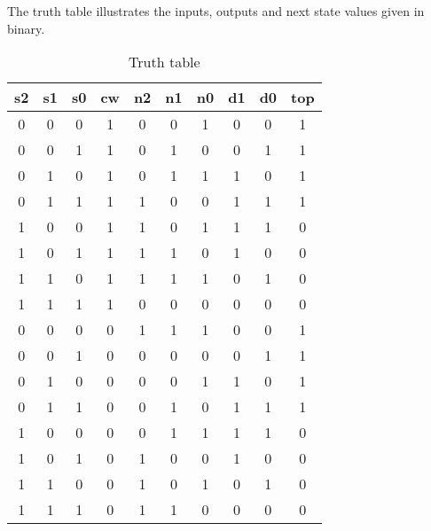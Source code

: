 The truth table illustrates the inputs, outputs and next state values given in binary.
\begin{table}
\begin{center}
\begin{tabular}{cccc|cccccc}
\centering 
s2 & s1 & s0 & cw & n2 & n1 & n0 & d1 & d0 & top\tabularnewline
\hline
\hline 
0 & 0 & 0 & 1 & 0 & 0 & 1 & 0 & 0 & 1\tabularnewline
\hline
0 & 0 & 1 & 1 & 0 & 1 & 0 & 0 & 1 & 1\tabularnewline
\hline 
0 & 1 & 0 & 1 & 0 & 1 & 1 & 1 & 0 & 1\tabularnewline
\hline 
0 & 1 & 1 & 1 & 1 & 0 & 0 & 1 & 1 & 1\tabularnewline
\hline 
1 & 0 & 0 & 1 & 1 & 0 & 1 & 1 & 1 & 0\tabularnewline
\hline 
1 & 0 & 1 & 1 & 1 & 1 & 0 & 1 & 0 & 0\tabularnewline
\hline 
1 & 1 & 0 & 1 & 1 & 1 & 1 & 0 & 1 & 0\tabularnewline
\hline 
1 & 1 & 1 & 1 & 0 & 0 & 0 & 0 & 0 & 0\tabularnewline
\hline 
0 & 0 & 0 & 0 & 1 & 1 & 1 & 0 & 0 & 1\tabularnewline
\hline 
0 & 0 & 1 & 0 & 0 & 0 & 0 & 0 & 1 & 1\tabularnewline
\hline 
0 & 1 & 0 & 0 & 0 & 0 & 1 & 1 & 0 & 1\tabularnewline
\hline 
0 & 1 & 1 & 0 & 0 & 1 & 0 & 1 & 1 & 1\tabularnewline
\hline 
1 & 0 & 0 & 0 & 0 & 1 & 1 & 1 & 1 & 0\tabularnewline
\hline 
1 & 0 & 1 & 0 & 1 & 0 & 0 & 1 & 0 & 0\tabularnewline
\hline 
1 & 1 & 0 & 0 & 1 & 0 & 1 & 0 & 1 & 0\tabularnewline
\hline 
1 & 1 & 1 & 0 & 1 & 1 & 0 & 0 & 0 & 0\tabularnewline
\hline
\end{tabular}
\caption{Truth table \label{table:truth table} }
\end{center}

\end{table}
